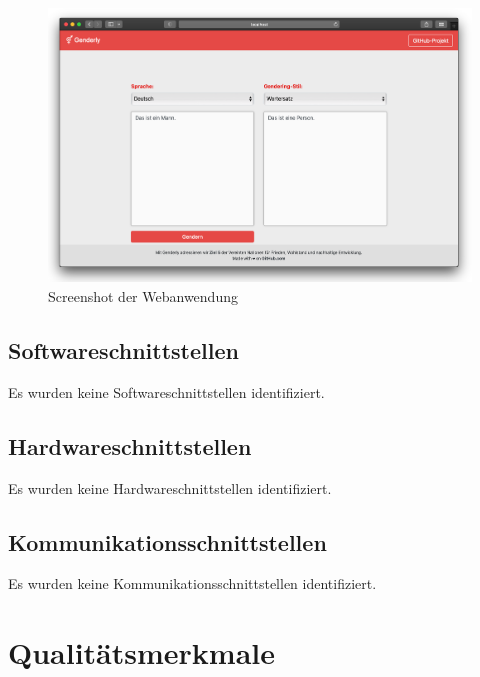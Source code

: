 \documentclass[paper=a4, parskip=half]{scrreprt}
\begin{document}
\begin{figure}[hbt!]
  \centering
  \includegraphics[scale=0.45]{Bilder/Screenshot.PNG}
  \vspace{-0.25cm}
  \caption[Screenshot der Webanwendung]{Screenshot der Webanwendung}
  \label{fig:Screenshot}
\end{figure} 

\section{Softwareschnittstellen}
Es wurden keine Softwareschnittstellen identifiziert.

\section{Hardwareschnittstellen}
Es wurden keine Hardwareschnittstellen identifiziert.

\section{Kommunikationsschnittstellen}
Es wurden keine Kommunikationsschnittstellen identifiziert.

\chapter{Qualitätsmerkmale}
\end{document}
